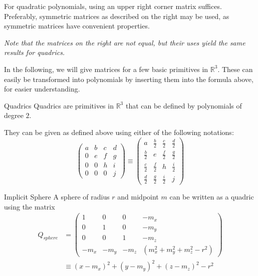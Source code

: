 \documentclass{panikzettel}
\begin{document}
\begin{halfboxl}
For quadratic polynomials, using an upper right corner matrix suffices. Preferably, symmetric matrices as described on the right may be used, as symmetric matrices have convenient properties.

\emph{Note that the matrices on the right are not equal, but their uses yield the same results for quadrics.}

In the following, we will give matrices for a few basic primitives in $\mathbb{R}^3$. These can easily be transformed into polynomials by inserting them into the formula above, for easier understanding.
\end{halfboxl}%
\begin{halfboxr}
\vspace{-\baselineskip}
\begin{defi}{Quadrics}
Quadrics are primitives in $\mathbb{R}^3$ that can be defined by polynomials of degree $2$.

They can be given as defined above using either of the following notations:
$$\begin{pmatrix}
a & b & c & d \\
0 & e & f & g \\
0 & 0 & h & i \\
0 & 0 & 0 & j
\end{pmatrix} \equiv
\begin{pmatrix}
a & \frac{b}{2} & \frac{c}{2} & \frac{d}{2} \\
\frac{b}{2} & e & \frac{f}{2} & \frac{g}{2} \\
\frac{c}{2} & \frac{f}{2} & h & \frac{i}{2} \\
\frac{d}{2} & \frac{g}{2} & \frac{i}{2} & j
\end{pmatrix}$$
\end{defi}
\end{halfboxr}

\begin{defi}{Implicit Sphere}
A sphere of radius $r$ and midpoint $m$ can be written as a quadric using the matrix
\begin{align*}Q_{sphere} &=
\begin{pmatrix}
1 & 0 & 0 & -m_x \\
0 & 1 & 0 & -m_y \\
0 & 0 & 1 & -m_z \\
-m_x & -m_y & -m_z & (m_x^2 + m_y^2 + m_z^2 - r^2)
\end{pmatrix} \\
&\equiv (x-m_x)^2 + (y-m_y)^2 + (z-m_z)^2 -r^2
\end{align*}
\end{defi}
\end{document}
